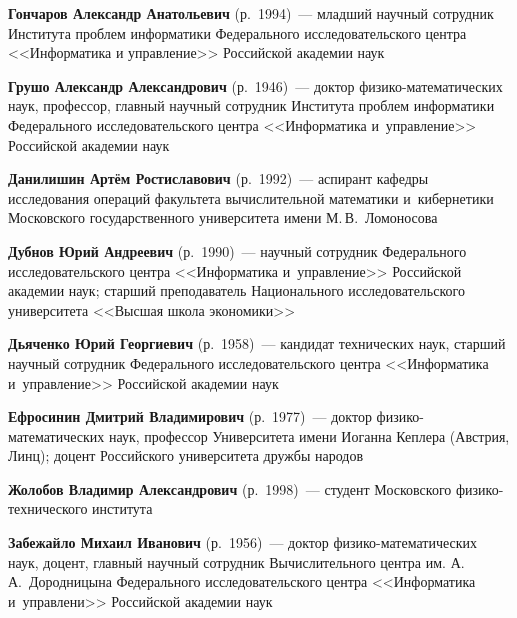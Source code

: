 \begin{multicols}{2}
\smallskip  

\noindent
\textbf{Гончаров Александр Анатольевич} (р.\ 1994)~--- младший научный сотрудник Института 
проб\-лем информатики Федерального исследовательского цент\-ра <<Информатика и управ\-ле\-ние>> 
Российской академии наук

\smallskip  

\noindent
\textbf{Грушо Александр Александрович} (р.\ 1946)~--- доктор фи\-зи\-ко-ма\-те\-ма\-ти\-че\-ских 
наук, профессор, главный научный сотрудник Института проб\-лем информатики Федерального 
исследовательского цент\-ра <<Информатика и~управ\-ле\-ние>> Российской академии наук

\smallskip 
 
\noindent
\textbf{Данилишин Артём Ростиславович} (р.\ 1992)~--- аспирант кафедры исследования операций 
факультета вычислительной математики и~кибернетики Московского государственного 
университета имени М.\,В.~Ломоносова 

\smallskip  

\noindent
\textbf{Дубнов Юрий Андреевич} (р.\ 1990)~--- научный сотрудник Федерального 
исследовательского центра <<Информатика и~управ\-ле\-ние>> Российской академии наук; 
старший преподаватель Национального исследовательского университета <<Высшая школа 
экономики>>

\smallskip  

\noindent
\textbf{Дьяченко Юрий Георгиевич} (р.\ 1958)~--- кандидат технических наук, старший научный 
сотрудник Федерального исследовательского центра <<Информатика и~управ\-ле\-ние>> Российской 
академии наук

\smallskip  

\noindent
\textbf{Ефросинин Дмитрий Владимирович} (р.\ 1977)~--- доктор фи\-зи\-ко-ма\-те\-ма\-ти\-че\-ских 
наук, профессор Университета имени Иоганна Кеплера (Австрия, Линц); доцент Российского 
университета дружбы народов

\smallskip 

 \noindent
\textbf{Жолобов Владимир Александрович} (р.\ 1998)~--- студент Московского 
фи\-зи\-ко-тех\-ни\-че\-ско\-го института

\smallskip  

\noindent
\textbf{Забежайло Михаил Иванович} (р.\ 1956)~--- доктор фи\-зи\-ко-ма\-те\-ма\-ти\-че\-ских наук, 
доцент, главный научный сотрудник Вычислительного цент\-ра им. А.\,А.~Дородницына 
Федерального исследовательского цен\-тра <<Информатика и~управ\-ле\-ни>> Российской 
академии наук


\end{multicols}
